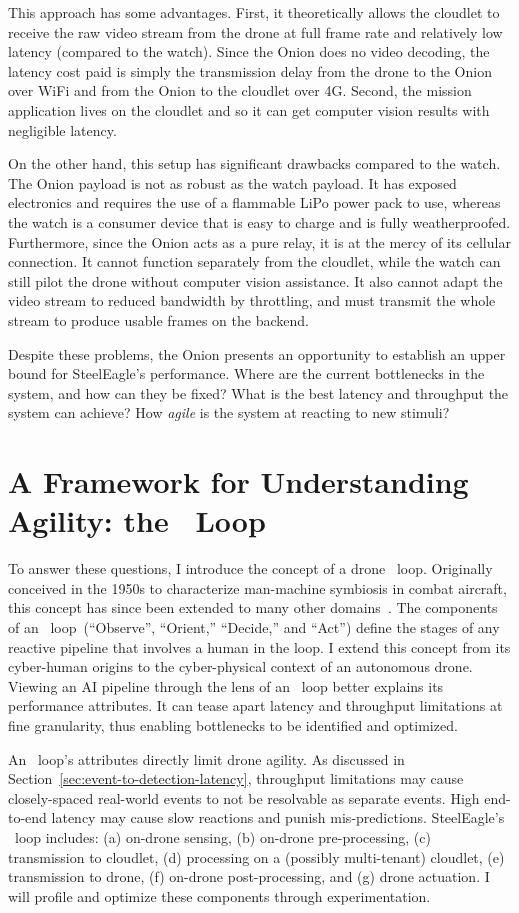 This approach has some advantages. First, it theoretically allows the cloudlet to receive the raw video stream from the drone at full frame rate and relatively low latency (compared to the watch). Since the Onion does no video decoding, the latency cost paid is simply the transmission delay from the drone to the Onion over WiFi and from the Onion to the cloudlet over 4G. Second, the mission application lives on the cloudlet and so it can get computer vision results with negligible latency.

On the other hand, this setup has significant drawbacks compared to the watch. The Onion payload is not as robust as the watch payload. It has exposed electronics and requires the use of a flammable LiPo power pack to use, whereas the watch is a consumer device that is easy to charge and is fully weatherproofed. Furthermore, since the Onion acts as a pure relay, it is at the mercy of its cellular connection. It cannot function separately from the cloudlet, while the watch can still pilot the drone without computer vision assistance. It also cannot adapt the video stream to reduced bandwidth by throttling, and must transmit the whole stream to produce usable frames on the backend.

Despite these problems, the Onion presents an opportunity to establish an upper bound for SteelEagle's performance. Where are the current bottlenecks in the system, and how can they be fixed? What is the best latency and throughput the system can achieve? How \textit{agile} is the system at reacting to new stimuli?

\section{A Framework for Understanding Agility: the \ooda~Loop}
\label{sec:ooda-intro}
To answer these questions, I introduce the concept of a drone \ooda~loop. Originally conceived in the 1950s to characterize
man-machine symbiosis in combat aircraft, this concept has
since been extended to many other domains~\cite{Boyd1986, Blaha2018, Johnson2023}.  The components of an \ooda~loop~(``Observe'', ``Orient,'' ``Decide,'' and
``Act'') define the stages of any reactive pipeline that involves a
human in the loop.  I extend this concept from its
cyber-human origins to the cyber-physical context of an autonomous
drone.  Viewing an AI pipeline through the lens of an \ooda~loop better explains its performance attributes.  It can tease apart latency and throughput limitations at fine granularity, thus enabling bottlenecks to be identified and optimized.

An \ooda~loop's attributes directly limit drone agility.  As discussed in Section~\ref{sec:event-to-detection-latency}, throughput limitations may cause closely-spaced real-world events to not be
resolvable as separate events.  High end-to-end latency
may cause slow reactions and punish mis-predictions. SteelEagle's \ooda~loop includes: (a) on-drone sensing, (b) on-drone
pre-processing, (c) transmission to cloudlet, (d) processing on a
(possibly multi-tenant) cloudlet, (e) transmission to drone, (f)
on-drone post-processing, and (g) drone actuation. I will profile and optimize these components through experimentation.

